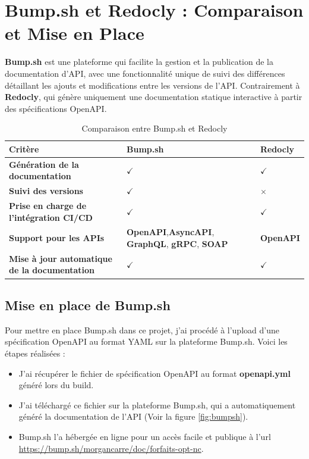 \documentclass{article}
\begin{document}
	\section{Bump.sh et Redocly : Comparaison et Mise en Place}
	
	\textbf{Bump.sh} est une plateforme qui facilite la gestion et la publication de la documentation d'API, avec une fonctionnalité unique de suivi des différences détaillant les ajouts et modifications entre les versions de l'API. Contrairement à \textbf{Redocly}, qui génère uniquement une documentation statique interactive à partir des spécifications OpenAPI.	
	
	\begin{table}[h!]
		\centering
		\begin{tabularx}{\textwidth}{|X|X|X|}
			\hline
			\textbf{Critère} & \textbf{Bump.sh} & \textbf{Redocly} \\
			\hline
			\textbf{Génération de la documentation} & $\checkmark$ & $\checkmark$ \\
			\hline
			\textbf{Suivi des versions} & $\checkmark$ & $\times$ \\
			\hline
			\textbf{Prise en charge de l'intégration CI/CD} & $\checkmark$ & $\checkmark$ \\
			\hline
			\textbf{Support pour les APIs} &  \textbf{OpenAPI},\textbf{AsyncAPI}, \textbf{GraphQL}, \textbf{gRPC}, \textbf{SOAP} & \textbf{OpenAPI} \\
			\hline
			\textbf{Mise à jour automatique de la documentation} & $\checkmark$ & $\checkmark$ \\
			\hline
		\end{tabularx}
		\caption{Comparaison entre Bump.sh et Redocly}
	\end{table}
	\subsection{Mise en place de Bump.sh}
	
	Pour mettre en place Bump.sh dans ce projet, j'ai procédé à l'upload d'une spécification OpenAPI au format YAML sur la plateforme Bump.sh. Voici les étapes réalisées :
	
	\begin{itemize}
		\item J'ai récupérer le fichier de spécification OpenAPI au format \textbf{openapi.yml} généré lors du build.
		\item J'ai téléchargé ce fichier sur la plateforme Bump.sh, qui a automatiquement généré la documentation de l'API (Voir la figure \ref{fig:bumpsh}).
		\item Bump.sh l'a hébergée en ligne pour un accès facile et publique à l'url \url{https://bump.sh/morgancarre/doc/forfaits-opt-nc}.
	\end{itemize}
		
\end{document}
